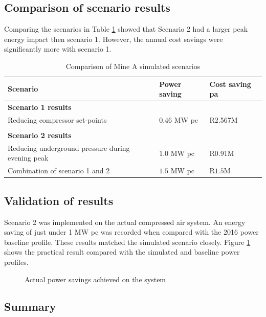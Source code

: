 \subsection{Comparison of scenario results}
Comparing the scenarios in Table \ref{Table: A Comparison} showed that Scenario 2 had a larger peak energy impact then scenario 1. However, the annual cost savings were significantly more with scenario 1.
\begin{table}[h!]
	\centering
	\begin{tabular}{p{}
			p{}
			p{}}
		\hline 
		Scenario  &  Power saving & Cost saving \gls{pa}  \\
		\hline
		\multicolumn{3}{l}{\textbf{Scenario 1 results}} \\
		Reducing compressor set-points & $ 0.46 $ MW \gls{pc} & R2.567M \\
		\\
		\multicolumn{3}{l}{\textbf{Scenario 2 results}}  \\
		Reducing underground pressure during evening peak& $ 1.0 $ MW \gls{pc} & R$ 0.91 $M\\
		Combination of scenario 1 and 2& $ 1.5 $ MW \gls{pc} & R$ 1.5 $M\\
		\hline 
	\end{tabular}
	\caption{Comparison of Mine A simulated scenarios}
	\label{Table: A Comparison}
\end{table}

\subsection{Validation of results}
Scenario 2 was implemented on the actual compressed air system. An energy saving of just under 1 MW \gls{pc} was recorded when compared with the 2016 power baseline profile. These results matched the simulated scenario closely. Figure \ref{fig: Actual permormance beet} shows the practical result compared with the simulated and baseline power profiles.
\begin{figure}[h!]
	\centering
	
	\caption{Actual power savings achieved on the system}
	\label{fig: Actual permormance beet}
\end{figure}
\subsection{Summary}
\newpage
